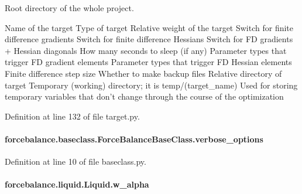 Root directory of the whole project. 

Name of the target Type of target Relative weight of the target Switch for finite difference gradients Switch for finite difference Hessians Switch for F\-D gradients + Hessian diagonals How many seconds to sleep (if any) Parameter types that trigger F\-D gradient elements Parameter types that trigger F\-D Hessian elements Finite difference step size Whether to make backup files Relative directory of target Temporary (working) directory; it is temp/(target\-\_\-name) Used for storing temporary variables that don't change through the course of the optimization 

Definition at line 132 of file target.\-py.

\hypertarget{classforcebalance_1_1baseclass_1_1ForceBalanceBaseClass_a8088e1e20cbd6bc175fb9c9fe9fa0f18}{
\paragraph[{verbose\-\_\-options}]{\setlength{\rightskip}{0pt plus 5cm}forcebalance.\-baseclass.\-Force\-Balance\-Base\-Class.\-verbose\-\_\-options\hspace{0.3cm}{\ttfamily [inherited]}}}\label{classforcebalance_1_1baseclass_1_1ForceBalanceBaseClass_a8088e1e20cbd6bc175fb9c9fe9fa0f18}


Definition at line 10 of file baseclass.\-py.

\hypertarget{classforcebalance_1_1liquid_1_1Liquid_a0d36d27d8c406b53bbb1096fbb76adbb}{
\paragraph[{w\-\_\-alpha}]{\setlength{\rightskip}{0pt plus 5cm}forcebalance.\-liquid.\-Liquid.\-w\-\_\-alpha\hspace{0.3cm}{\ttfamily [inherited]}}}\label{classforcebalance_1_1liquid_1_1Liquid_a0d36d27d8c406b53bbb1096fbb76adbb}


